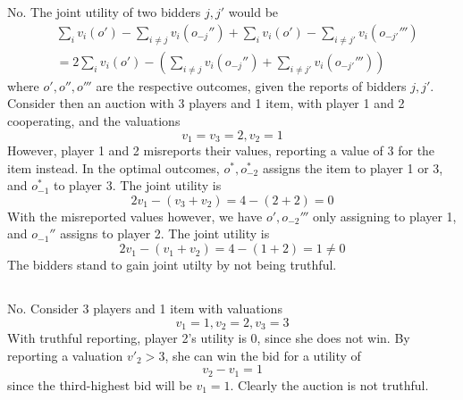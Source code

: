 \subsection{}
No. The joint utility of two bidders $j,j'$ would be
\begin{equation}
\begin{aligned}
    &\sum_i v_i(o')-\sum_{i\neq j} v_i(o_{-j}'')
    + \sum_i v_i(o')-\sum_{i\neq j'} v_i(o_{-j'}''')\\
    &=2\sum_i v_i(o')
    -\left(\sum_{i\neq j} v_i(o_{-j}'') 
    + \sum_{i\neq j'} v_i(o_{-j'}''')\right)
\end{aligned}
\end{equation}
where $o',o'',o'''$ are the respective outcomes, 
given the reports of bidders $j,j'$.
Consider then an auction with 3 players and 1 item, 
with player 1 and 2 cooperating, and the valuations
\[v_1=v_3=2,v_2=1\]
However, player 1 and 2 misreports their values, reporting
a value of 3 for the item instead.
In the optimal outcomes, $o^*,o_{-2}^*$ assigns the item to player 1 or 3,
and $o_{-1}^*$ to player 3.
The joint utility is
\[2v_1-(v_3+v_2)=4-(2+2)=0\]
With the misreported values however, 
we have $o',o_{-2}'''$ only assigning to player 1, 
and $o_{-1}''$ assigns to player 2.
The joint utility is 
\[2v_1-(v_1+v_2)=4-(1+2)=1\neq 0\]
The bidders stand to gain joint utilty by not being truthful.

\subsection{}
No. Consider 3 players and 1 item with valuations
\[v_1=1,v_2=2,v_3=3\]
With truthful reporting, player 2's utility is 0, since she does not win.
By reporting a valuation $v'_2>3$, she can win the bid for a utility of
\[v_2-v_1=1\]
since the third-highest bid will be $v_1=1$.
Clearly the auction is not truthful.

